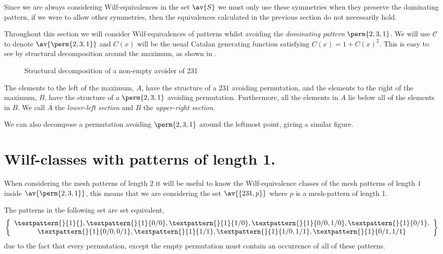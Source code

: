 Since we are always considering Wilf-equivalences in the set \(\av{S}\) we
must only use these symmetries when they preserve the dominating pattern, if we
were to allow other symmetries, then the equivalences calculated in the previous
section do not necessarily hold.

Throughout this section we will consider Wilf-equivalences of patterns
whilst avoiding the \emph{dominating pattern} \(\perm{2,3,1}\). We will
use \(\mathcal{C}\) to denote \(\av{\perm{2,3,1}}\) and \(C(x)\) will
be the usual Catalan generating function satisfying \(C(x) = 1 + C(x)^2\).
This is easy to see by structural decomposition around the maximum, as
shown in .

\begin{figure}[!ht]
    \centering
    \caption{Structural decomposition of a non-empty avoider of 231}
    \label{fig:decompmax}
\end{figure}

The elements to the left of the maximum, \(A\), have the structure of a \(231\)
avoiding permutation, and the elements to the right of the maximum, \(B\), have the
structure of a \(\perm{2,3,1}\) avoiding permutation. Furthermore, all the
elements in \(A\) lie below all of the elements in \(B\). We call \(A\) the
\emph{lower-left section} and \(B\) the \emph{upper-right section}.

We can also decompose a permutation avoiding \(\perm{2,3,1}\) around the leftmost
point, giving a similar figure.

\section{Wilf-classes with patterns of length 1.}
When considering the mesh patterns of length \(2\) it will be useful to know
the Wilf-equivalence classes of the mesh patterns of length \(1\) inside
\(\av{\perm{2,3,1}}\), this means that we are considering the set \(\av{\{231,p\}}\)
where \(p\) is a mesh-pattern of length 1.

The patterns in the following set are set equivalent,
\begin{equation*}
    \left\{
        \begin{array}{c}
        \textpattern{}{1}{},
        \textpattern{}{1}{0/0},
        \textpattern{}{1}{1/0},
        \textpattern{}{1}{0/0,1/0},
        \textpattern{}{1}{0/1},\\
        \textpattern{}{1}{0/0,0/1},
        \textpattern{}{1}{1/1},
        \textpattern{}{1}{1/0,1/1},
        \textpattern{}{1}{0/1,1/1}
    \end{array}
    \right\}
\end{equation*}
due to the fact that every permutation, except the empty
permutation must contain an occurrence of all of these patterns.

